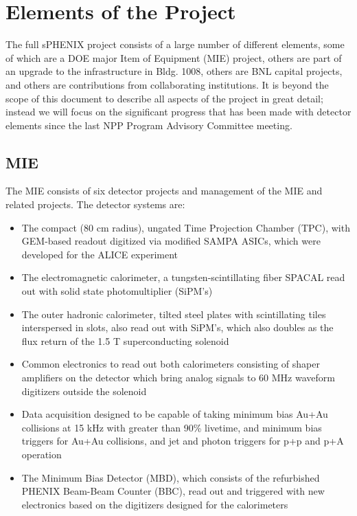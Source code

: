 \section{Elements of the Project}
\label{sec:elements}

The full sPHENIX project consists of a large number of different
elements, some of which are a DOE major Item of Equipment (MIE) project,
others are part of an
upgrade to the infrastructure in Bldg. 1008, others are BNL capital
projects, and others are contributions from collaborating
institutions.  It is beyond the scope of this document to describe all
aspects of the project in great detail; instead we will focus on
the significant progress that has been made with detector elements
since the last NPP Program Advisory Committee meeting.

\subsection{MIE}

The MIE consists of six detector projects and management of the
MIE and related projects.
The detector systems are:

\begin{itemize}
    \item The compact (80 cm radius), ungated Time Projection Chamber (TPC), with GEM-based readout digitized via modified SAMPA ASICs, which were developed for the ALICE experiment
    \item The electromagnetic calorimeter, a tungsten-scintillating fiber
    SPACAL read out with solid state photomultiplier (SiPM's)
    \item The outer hadronic calorimeter, tilted steel plates with scintillating tiles
    interspersed in slots, also read out with SiPM's, which also doubles
    as the flux return of the 1.5 T superconducting solenoid
    \item Common electronics to read out both calorimeters consisting of
    shaper amplifiers on the detector which bring analog signals to 60 MHz waveform digitizers outside the solenoid
    \item Data acquisition designed to be capable of taking minimum bias
    Au+Au collisions at 15 kHz with greater than 90\% livetime, and minimum bias triggers for Au+Au collisions, and jet and photon triggers for p+p and p+A operation
    \item The Minimum Bias Detector (MBD), which consists of the refurbished PHENIX Beam-Beam Counter (BBC), read out and triggered with new electronics based on the digitizers designed for the calorimeters
\end{itemize}

